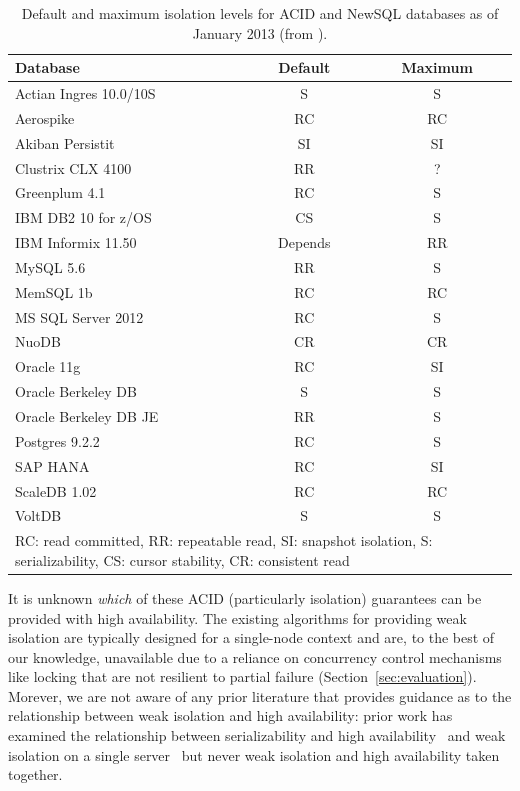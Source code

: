 \begin{table}
\begin{center}
\begin{small}
\begin{tabular}{|l|c|c|}
\hline
Database & Default & Maximum\\\hline
Actian Ingres 10.0/10S & S & S\\
Aerospike & RC & RC\\
Akiban Persistit & SI & SI\\
Clustrix CLX 4100 & RR & ?\\
Greenplum 4.1 & RC & S \\
IBM DB2 10 for z/OS & CS & S\\
IBM Informix 11.50 & Depends & RR\\
MySQL 5.6 & RR & S \\
MemSQL 1b & RC & RC\\
MS SQL Server 2012 & RC & S \\
NuoDB & CR & CR\\
Oracle 11g & RC & SI\\
Oracle Berkeley DB & S & S\\
Oracle Berkeley DB JE & RR & S\\
Postgres 9.2.2 & RC & S\\
SAP HANA & RC & SI\\
ScaleDB 1.02 & RC & RC\\
VoltDB & S & S\\
\hline
\multicolumn{3}{|p{7cm}|}{{\footnotesize RC: read committed, RR: repeatable read, SI: snapshot isolation, S: serializability, CS: cursor stability, CR: consistent read}}\\\hline

\end{tabular}
\caption{Default and maximum isolation levels for ACID and NewSQL
  databases as of January 2013 (from
  \protect\cite{hat-hotos}).}\vspace{-1.5em}
\label{table:existing}
\end{small}
\end{center}
\end{table}

It is unknown \textit{which} of these ACID (particularly isolation)
guarantees can be provided with high availability. The existing
algorithms for providing weak isolation are typically designed for a
single-node context and are, to the best of our knowledge, unavailable
due to a reliance on concurrency control mechanisms like locking that
are not resilient to partial failure
(Section~\ref{sec:evaluation}). Morever, we are not aware of any prior
literature that provides guidance as to the relationship between weak
isolation and high availability: prior work has examined the
relationship between serializability and high
availability~\cite{davidson-survey} and weak isolation on a
single server~\cite{adya, ansicritique, gray-isolation} but never weak isolation and
high availability taken together.
